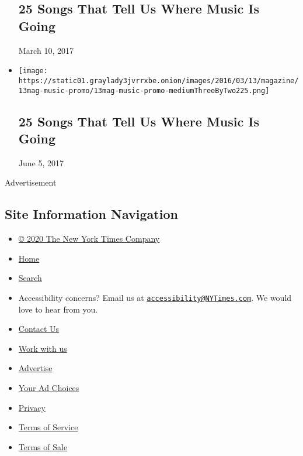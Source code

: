 \begin{itemize}
  \hypertarget{25-songs-that-tell-us-where-music-is-going-1}{%
  \subsection{25 Songs That Tell Us Where Music Is
  Going}\label{25-songs-that-tell-us-where-music-is-going-1}}

  March 10, 2017
\item
  \href{https://www.nytimes3xbfgragh.onion/interactive/2016/03/10/magazine/25-songs-that-tell-us-where-music-is-going.html}{}

  \texttt{[image: https://static01.graylady3jvrrxbe.onion/images/2016/03/13/magazine/13mag-music-promo/13mag-music-promo-mediumThreeByTwo225.png]}

  \hypertarget{25-songs-that-tell-us-where-music-is-going-2}{%
  \subsection{25 Songs That Tell Us Where Music Is
  Going}\label{25-songs-that-tell-us-where-music-is-going-2}}

  June 5, 2017
\end{itemize}

Advertisement

\hypertarget{site-information-navigation}{%
\subsection{Site Information
Navigation}\label{site-information-navigation}}

\begin{itemize}
\tightlist
\item
  \href{https://help.nytimes3xbfgragh.onion/hc/en-us/articles/115014792127-Copyright-notice}{©
  2020 The New York Times Company}
\item
  \href{https://www.nytimes3xbfgragh.onion}{Home}
\item
  \href{https://www.nytimes3xbfgragh.onion/search/}{Search}
\item
  Accessibility concerns? Email us at
  \href{mailto:accessibility@NYTimes.com}{\nolinkurl{accessibility@NYTimes.com}}.
  We would love to hear from you.
\item
  \href{https://help.nytimes3xbfgragh.onion/hc/en-us/articles/115015385887-Contact-Us}{Contact
  Us}
\item
  \href{https://www.nytco.com/careers/}{Work with us}
\item
  \href{https://nytmediakit.com/}{Advertise}
\item
  \href{https://help.nytimes3xbfgragh.onion/hc/en-us/articles/115014892108-Privacy-policy\#pp}{Your
  Ad Choices}
\item
  \href{https://help.nytimes3xbfgragh.onion/hc/en-us/articles/115014892108-Privacy-policy}{Privacy}
\item
  \href{https://help.nytimes3xbfgragh.onion/hc/en-us/articles/115014893428-Terms-of-service}{Terms
  of Service}
\item
  \href{https://help.nytimes3xbfgragh.onion/hc/en-us/articles/115014893968-Terms-of-sale}{Terms
  of Sale}
\end{itemize}

